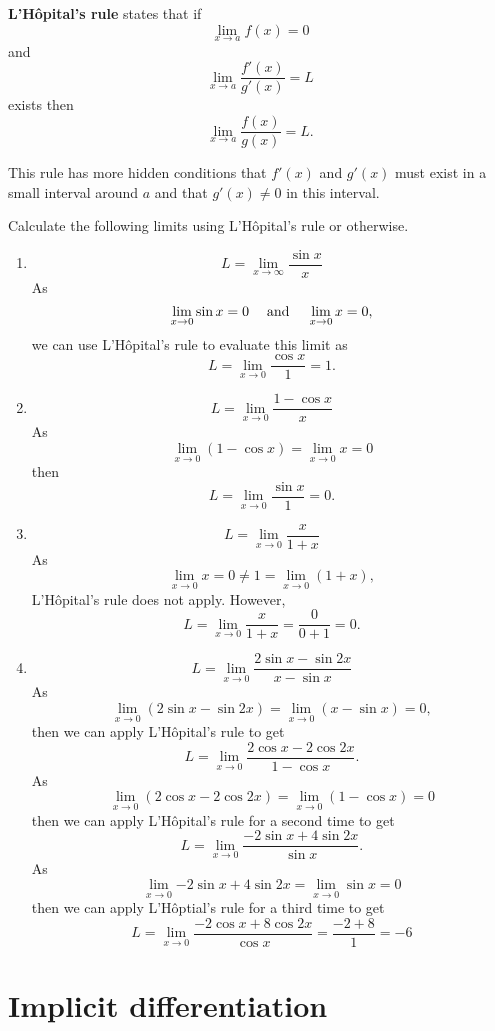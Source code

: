 \begin{definition}
    \textbf{L'H\^opital's rule} states that if \[\lim_{x\to a}f(x)=0\] and \[\lim_{x\to a}\dfrac{f'(x)}{g'(x)}=L\] exists then \[\lim_{x\to a}\dfrac{f(x)}{g(x)}=L.\]
\end{definition}

\begin{remark}
    This rule has more hidden conditions that $f'(x)$ and $g'(x)$ must exist in a small interval around $a$ and that $g'(x)\neq 0$ in this interval.
\end{remark}

\begin{example}
	Calculate the following limits using L'H\^opital's rule or otherwise.
	\begin{enumerate}
		\item \[L=\lim_{x\to\infty}\dfrac{\sin x}x\] 
		As \[\lim_{x\to0}\sin x=0 \quad\;\text{and}\;\quad\lim_{x\to0}x=0,\] we can use L'H\^opital's rule to evaluate this limit as \[L=\lim_{x\to0}\dfrac{\cos x}1=1.\]
		
		\item \[L=\lim_{x\to0}\dfrac{1-\cos x}x\]
		As \[\lim_{x\to0}(1-\cos x)=\lim_{x\to0}x=0\] then \[L=\lim_{x\to0}\dfrac{\sin x}1=0.\]
		
		\item \[L=\lim_{x\to0}\dfrac{x}{1+x}\]
		As \[\lim_{x\to0}x=0\neq1=\lim_{x\to0}{(1+x)},\] L'H\^opital's rule does not apply. However, \[L=\lim_{x\to0}\dfrac x{1+x}=\dfrac0{0+1}=0.\]
		
		\item \[L=\lim_{x\to0}\dfrac{2\sin{x}-\sin{2x}}{x-\sin{x}}\]
		As \[\lim_{x\to0}{(2\sin{x}-\sin{2x})}=\lim_{x\to0}{(x-\sin{x})}=0,\] then we can apply L'H\^opital's rule to get \[L=\lim_{x\to0}\dfrac{2\cos{x}-2\cos{2x}}{1-\cos{x}}.\]
		As \[\lim_{x\to0}{(2\cos x-2\cos{2x})}=\lim_{x\to0}{(1-\cos{x})}=0\] then we can apply L'H\^opital's rule for a second time to get \[L=\lim_{x\to0}\dfrac{-2\sin x+4\sin{2x}}{\sin x}.\]
		As \[\lim_{x\to0}{-2\sin{x}+4\sin{2x}}=\lim_{x\to0}{\sin{x}}=0\] then we can apply L'H\^optial's rule for a third time to get \[L=\lim_{x\to0}\dfrac{-2\cos{x}+8\cos{2x}}{\cos{x}}=\dfrac{-2+8}{1}=-6\]
	\end{enumerate}
\end{example}

\section{Implicit differentiation}

